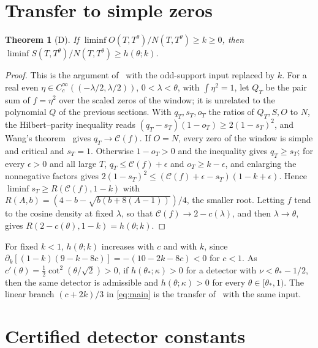 \documentclass[11pt]{article}
\newtheorem{theorem}{Theorem}[section]
\theoremstyle{remark}
\begin{document}
\section{Transfer to simple zeros}\label{sec:transfer}

\begin{theorem}[D]\label{thm:transfer}
If $\liminf O(T,T^\theta)/N(T,T^\theta)\ge k\ge0$, then
$\liminf S(T,T^\theta)/N(T,T^\theta)\ge h(\theta;k)$.
\end{theorem}

\begin{proof}
This is the argument of~\cite[proof of Theorem 1.2]{CAOSShort} with the
odd-support input replaced by $k$. For a real even $\eta\in
C_c^\infty((-\lambda/2,\lambda/2))$, $0<\lambda<\theta$, with $\int\eta^2=1$,
let $Q_T$ be the pair sum of $f=\eta^2$ over the scaled zeros of the window;
it is unrelated to the polynomial $Q$ of the previous sections. With
$q_T,s_T,o_T$ the ratios of $Q_T,S,O$ to $N$, the Hilbert--parity inequality
\cite[Proposition 2.5]{CAOSShort} reads $(q_T-s_T)(1-o_T)\ge2(1-s_T)^2$, and
Wang's theorem~\cite[Theorem 2.2]{WangShort} gives $q_T\to\mathcal C(f)$. If
$O=N$, every zero of the window is simple and critical and $s_T=1$. Otherwise
$1-o_T>0$ and the inequality gives $q_T\ge s_T$; for every $\epsilon>0$ and all
large $T$, $q_T\le\mathcal C(f)+\epsilon$ and $o_T\ge k-\epsilon$, and enlarging
the nonnegative factors gives
$2(1-s_T)^2\le(\mathcal C(f)+\epsilon-s_T)(1-k+\epsilon)$. Hence
$\liminf s_T\ge R(\mathcal C(f),1-k)$ with
$R(A,b)=(4-b-\sqrt{b(b+8(A-1))})/4$, the smaller root. Letting $f$ tend to the
cosine density at fixed $\lambda$, so that $\mathcal C(f)\to2-c(\lambda)$, and
then $\lambda\to\theta$, gives $R(2-c(\theta),1-k)=h(\theta;k)$.
\end{proof}

For fixed $k<1$, $h(\theta;k)$ increases with $c$ and with $k$, since
$\partial_k[(1-k)(9-k-8c)]=-(10-2k-8c)<0$ for $c<1$. As
$c'(\theta)=\frac12\cot^2(\theta/\sqrt2)>0$, if $h(\theta_*;\kappa)>0$ for a
detector with $\nu<\theta_*-1/2$, then the same detector is admissible and
$h(\theta;\kappa)>0$ for every $\theta\in[\theta_*,1)$. The linear branch
$(c+2k)/3$ in \eqref{eq:main} is the transfer of~\cite[Theorem 1.4]{CAOSShort}
with the same input.

\section{Certified detector constants}\label{sec:certify}
\end{document}
